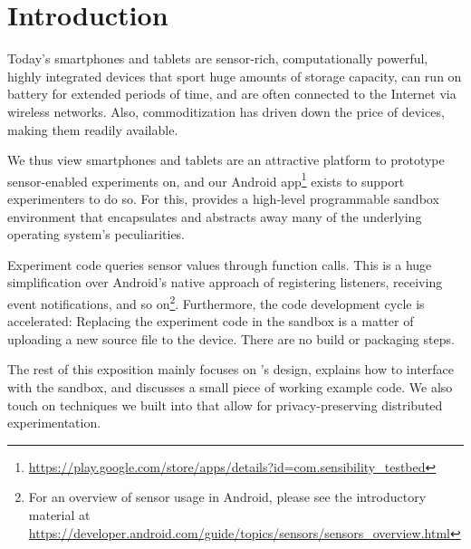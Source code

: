 \section{Introduction}

Today's smartphones and tablets are sensor-rich, computationally 
powerful, highly integrated devices that sport huge amounts of storage 
capacity, can run on battery for extended periods of time, and are often 
connected to the Internet via wireless networks.
Also, commoditization has driven down the price of devices, making them 
readily available.

We thus view smartphones and tablets are an attractive platform to 
prototype sensor-enabled experiments on, and our \sys Android 
app\footnote{\url{https://play.google.com/store/apps/details?id=com.sensibility_testbed}} 
exists to support experimenters to do so. For this, \sys provides a 
high-level programmable sandbox environment that encapsulates and 
abstracts away many of the underlying operating system's peculiarities. 

Experiment code queries sensor values through function calls. 
This is a huge simplification over Android's native approach of registering 
listeners, receiving event notifications, and so on\footnote{For an overview of sensor usage in Android, please see the introductory material at \url{https://developer.android.com/guide/topics/sensors/sensors_overview.html}}.
Furthermore, the code development cycle is accelerated: Replacing the 
experiment code in the sandbox is a matter of uploading a new source 
file to the device. There are no build or packaging steps.

The rest of this exposition mainly focuses on \sys's design, 
explains how to interface with the sandbox, and discusses a small piece 
of working example code. We also touch on techniques we built into \sys 
that allow for privacy-preserving distributed experimentation.
